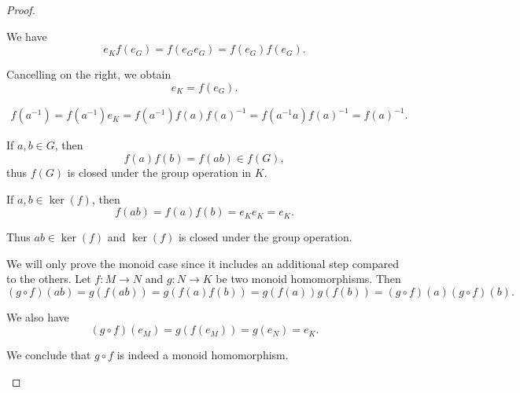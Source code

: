 \begin{proof}\mbox{}
  \begin{itemize}
     We have
    \begin{equation*}
      e_K f(e_G) = f(e_G e_G) = f(e_G) f(e_G).
    \end{equation*}

    Cancelling on the right, we obtain
    \begin{equation*}
      e_K = f(e_G).
    \end{equation*}

    \begin{align*}
      f(a^{-1})
      =
      f(a^{-1}) e_K
      =
      f(a^{-1}) f(a) f(a)^{-1}
      =
      f(a^{-1} a) f(a)^{-1}
      =
      f(a)^{-1}.
    \end{align*}

     If \( a, b \in G \), then
    \begin{equation*}
      f(a) f(b) = f(ab) \in f(G),
    \end{equation*}
    thus \( f(G) \) is closed under the group operation in \( K \).

     If \( a, b \in \ker(f) \), then
    \begin{equation*}
      f(ab) = f(a) f(b) = e_K e_K = e_K.
    \end{equation*}

    Thus \( ab \in \ker(f) \) and \( \ker(f) \) is closed under the group operation.

     We will only prove the monoid case since it includes an additional step compared to the others. Let \( f: M \to N \) and \( g: N \to K \) be two monoid homomorphisms. Then
    \begin{equation*}
      (g \circ f)(ab) = g(f(ab)) = g(f(a)f(b)) = g(f(a))g(f(b)) = (g \circ f)(a) (g \circ f)(b).
    \end{equation*}

    We also have
    \begin{equation*}
      (g \circ f)(e_M) = g(f(e_M)) = g(e_N) = e_K.
    \end{equation*}

    We conclude that \( g \circ f \) is indeed a monoid homomorphism.
  \end{itemize}
\end{proof}

